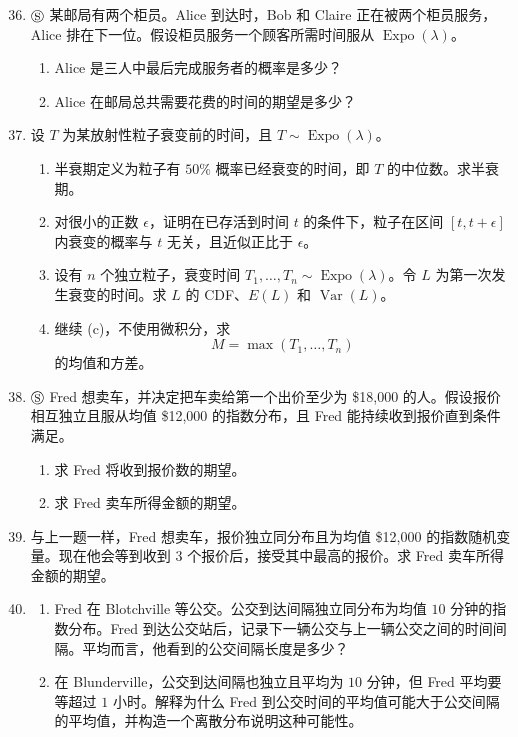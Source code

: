 \documentclass[UTF8, 12pt, fontset=fandol, oneside]{ctexart}
\begin{document}
\begin{enumerate}
  \setcounter{enumi}{35}
  \item $\circledS$ 某邮局有两个柜员。Alice 到达时，Bob 和 Claire 正在被两个柜员服务，Alice 排在下一位。假设柜员服务一个顾客所需时间服从 $\operatorname{Expo}(\lambda)$。
  \begin{enumerate}
    \item Alice 是三人中最后完成服务者的概率是多少？
    \item Alice 在邮局总共需要花费的时间的期望是多少？
  \end{enumerate}

  \item 设 $T$ 为某放射性粒子衰变前的时间，且 $T\sim\operatorname{Expo}(\lambda)$。
  \begin{enumerate}
    \item 半衰期定义为粒子有 $50\%$ 概率已经衰变的时间，即 $T$ 的中位数。求半衰期。
    \item 对很小的正数 $\epsilon$，证明在已存活到时间 $t$ 的条件下，粒子在区间 $[t,t+\epsilon]$ 内衰变的概率与 $t$ 无关，且近似正比于 $\epsilon$。
    \item 设有 $n$ 个独立粒子，衰变时间 $T_1,\ldots,T_n\sim\operatorname{Expo}(\lambda)$。令 $L$ 为第一次发生衰变的时间。求 $L$ 的 CDF、$E(L)$ 和 $\operatorname{Var}(L)$。
    \item 继续 (c)，不使用微积分，求
    \[
      M=\max(T_1,\ldots,T_n)
    \]
    的均值和方差。
  \end{enumerate}

  \item $\circledS$ Fred 想卖车，并决定把车卖给第一个出价至少为 \$18,000 的人。假设报价相互独立且服从均值 \$12,000 的指数分布，且 Fred 能持续收到报价直到条件满足。
  \begin{enumerate}
    \item 求 Fred 将收到报价数的期望。
    \item 求 Fred 卖车所得金额的期望。
  \end{enumerate}

  \item 与上一题一样，Fred 想卖车，报价独立同分布且为均值 \$12,000 的指数随机变量。现在他会等到收到 $3$ 个报价后，接受其中最高的报价。求 Fred 卖车所得金额的期望。

  \item
  \begin{enumerate}
    \item Fred 在 Blotchville 等公交。公交到达间隔独立同分布为均值 $10$ 分钟的指数分布。Fred 到达公交站后，记录下一辆公交与上一辆公交之间的时间间隔。平均而言，他看到的公交间隔长度是多少？
    \item 在 Blunderville，公交到达间隔也独立且平均为 $10$ 分钟，但 Fred 平均要等超过 $1$ 小时。解释为什么 Fred 到公交时间的平均值可能大于公交间隔的平均值，并构造一个离散分布说明这种可能性。
  \end{enumerate}


\end{enumerate}
\end{document}
